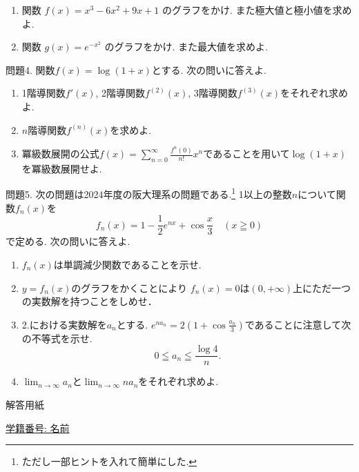 \documentclass[dvipdfmx,a4paper,11pt]{article}
\theoremstyle{definition}
\begin{document}
\begin{enumerate}
   \setlength{\parskip}{0cm} %
  \setlength{\itemsep}{0cm} %
    \item 関数 $f(x) = x^3 - 6x^2 + 9x + 1$ のグラフをかけ. また極大値と極小値を求めよ.
    
    \item 関数 $g(x) = e^{-x^2}$ のグラフをかけ. また最大値を求めよ.
    
\end{enumerate}
 
 問題4. 関数$f(x) = \log(1 +x)$とする. 次の問いに答えよ.
 
 \begin{enumerate}
    \setlength{\parskip}{0cm} %
  \setlength{\itemsep}{0cm} %
    \item 1階導関数$f'(x)$, 2階導関数$f^{(2)}(x)$, 3階導関数$f^{(3)}(x)$をそれぞれ求めよ.
    \item $n$階導関数$f^{(n)}(x)$を求めよ.
    \item 冪級数展開の公式$f(x) = \sum_{n=0}^{\infty}\frac{f^{n}(0)}{n!} x^{n}$であることを用いて$\log(1+x)$を冪級数展開せよ. 
\end{enumerate}


 問題5. 次の問題は2024年度の阪大理系の問題である.\footnote{ただし一部ヒントを入れて簡単にした.} 1以上の整数$n$について関数$f_{n}(x)$を
 $$
 f_n(x) = 1 - \frac{1}{2}e^{nx} +  \cos \frac{x}{3} \quad (x \geqq 0)
 $$
 で定める. 次の問いに答えよ. 
 \begin{enumerate}
   \setlength{\parskip}{0cm} %
  \setlength{\itemsep}{0cm} %
\item $f_{n}(x)$は単調減少関数であることを示せ. 
\item %
$y=f_{n}(x)$のグラフをかくことにより
$f_{n}(x)=0$は$(0,+\infty)$上にただ一つの実数解を持つことをしめせ．
\item 2.における実数解を$a_{n}$とする. $e^{na_n} = 2 (1 + \cos \frac{a_n}{3})$であることに注意して次の不等式を示せ.
$$
0 \leqq a_n \leqq \frac{\log 4}{n}.
$$
\item $\lim_{n \to \infty} a_n$と$\lim_{n \to \infty} na_n$をそれぞれ求めよ.
\end{enumerate}
 
 \newpage
 
  \begin{center}
 {\Large 解答用紙}
\end{center}


\begin{flushleft}
{ \large \underline{学籍番号: \hspace{4cm} 名前  \hspace{9cm}   }  }
\end{flushleft}
 

 
\end{document}
